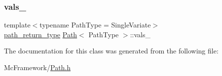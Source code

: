 \hypertarget{class_path_a6f90f314a504ea1c9828dd2aa999f6ff}{}\label{class_path_a6f90f314a504ea1c9828dd2aa999f6ff} 
\subsubsection{\texorpdfstring{vals\+\_\+}{vals\_}}
{\footnotesize\ttfamily template$<$typename Path\+Type = Single\+Variate$>$ \\
\hyperlink{class_path_a3b1c34a87f7867f6fed2e0a33f801e7d}{path\+\_\+return\+\_\+type} \hyperlink{class_path}{Path}$<$ Path\+Type $>$\+::vals\+\_\+\hspace{0.3cm}{\ttfamily [private]}}



The documentation for this class was generated from the following file\+:\begin{DoxyCompactItemize}
\item 
Mc\+Framework/\hyperlink{_path_8h}{Path.\+h}\end{DoxyCompactItemize}
